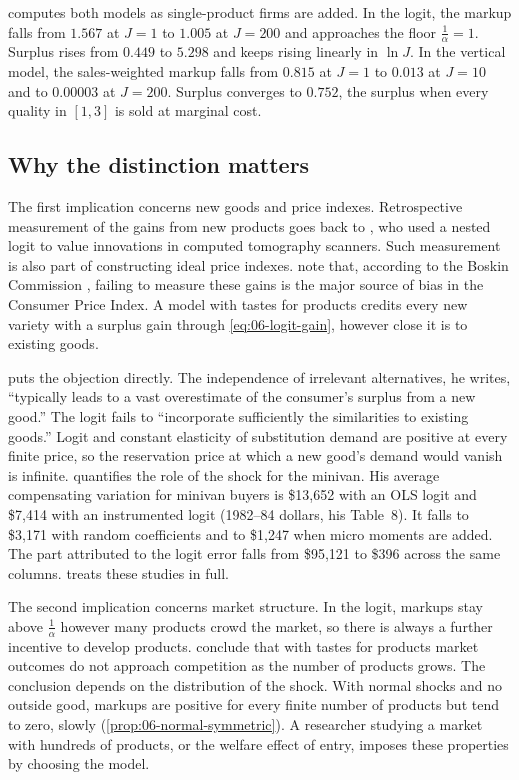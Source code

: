  computes both models as single-product firms are added. In the logit, the markup falls from
$1.567$ at $J = 1$ to $1.005$ at $J = 200$ and approaches the floor $\frac{1}{\alpha} = 1$. Surplus rises from $0.449$ to
$5.298$ and keeps rising linearly in $\ln J$. In the vertical model, the sales-weighted markup falls from $0.815$ at $J =
1$ to $0.013$ at $J = 10$ and to $0.00003$ at $J = 200$. Surplus converges to $0.752$, the surplus when every quality in
$[1,3]$ is sold at marginal cost.

\subsection{Why the distinction matters}\label{sec:06-eps-matters}

The first implication concerns new goods and price indexes. Retrospective measurement of the gains from new products
goes back to \citet{Trajtenberg1989}, who used a nested logit to value innovations in computed tomography scanners.
Such measurement is also part of constructing ideal price indexes. \citet{BerryPakes2007} note that, according to the Boskin
Commission \citep{BoskinEtAl1996}, failing to measure these gains is the major source of bias in the Consumer Price
Index. A model with tastes for products credits every new variety with a
surplus gain through \eqref{eq:06-logit-gain}, however close it is to existing goods.

\citet[p.~230]{Hausman1997} puts the objection directly. The independence of irrelevant alternatives, he writes,
``typically leads to a vast overestimate of the consumer's surplus from a new good.'' The logit fails to ``incorporate
sufficiently the similarities to existing goods.'' Logit and constant elasticity of substitution demand are positive at every finite price, so the reservation
price at which a new good's demand would vanish is infinite. \citet{Petrin2002} quantifies the role of the shock for
the minivan. His average compensating variation for minivan buyers is \$13,652 with an OLS logit and \$7,414 with an
instrumented logit (1982--84 dollars, his Table~8). It falls to \$3,171 with random coefficients and to \$1,247 when
micro moments are added. The part attributed to the logit error falls from \$95,121 to \$396 across the same columns.
 treats these studies in full.

The second implication concerns market structure. In the logit, markups stay above $\frac{1}{\alpha}$ however many
products crowd the market, so there is always a further incentive to develop products. \citet[p.~7]{BerryPakes2007}
conclude that with tastes for products market outcomes do not approach competition as the number of products grows.
The conclusion depends on the distribution of the shock. With normal shocks and no outside good, markups are positive for
every finite number of products but tend to zero, slowly (\cref{prop:06-normal-symmetric}). A researcher studying a market with
hundreds of products, or the welfare effect of entry, imposes these properties by choosing the model.


